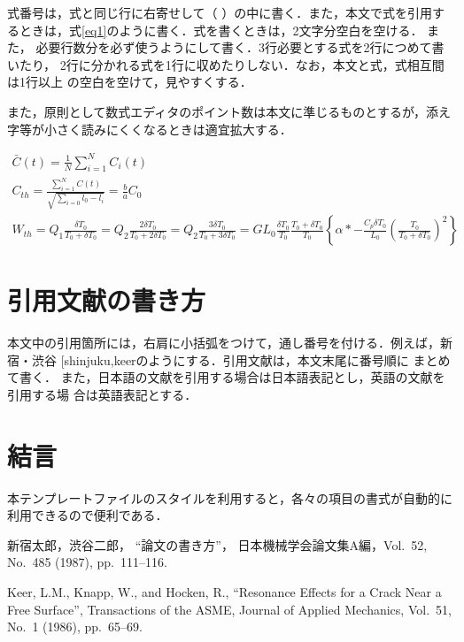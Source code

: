 \documentclass[a4paper, 10pt, dvips, fleqn]{jsarticle}
\makeatletter
\DeclareRobustCommand\cite{\unskip
\@ifnextchar[{\@tempswatrue\@citex}{\@tempswafalse\@citex[]}}
\makeatother
\begin{document}
式番号は，式と同じ行に右寄せして（ ）の中に書く．また，本文で式を引用す
るときは，式\eqref{eq1}のように書く．式を書くときは，2文字分空白を空ける．
また， 
必要行数分を必ず使うようにして書く．3行必要とする式を2行につめて書いたり，
2行に分かれる式を1行に収めたりしない．なお，本文と式，式相互間は1行以上
の空白を空けて，見やすくする． 

また，原則として数式エディタのポイント数は本文に準じるものとするが，添え
字等が小さく読みにくくなるときは適宜拡大する． 

\begin{gather}
 \bar{C}(t) = \frac{1}{N}\sum^{N}_{i=1}{C_{i}(t)} \\
 C_{th} = \frac{\displaystyle \sum^{N}_{i=1}{C(t)}}{\sqrt{\displaystyle \sum^{}_{i=0}{l_{0}-l_{i}}}}
 = \frac{b}{a}C_{0} \\
 W_{th} = Q_{1}\frac{\delta T_{0}}{T_{0} + \delta T_{0}}
 = Q_{2}\frac{2\delta T_{0}}{T_{0} + 2\delta T_{0}}
 = Q_{2}\frac{3\delta T_{0}}{T_{0} + 3\delta T_{0}}
 = GL_{0}\frac{\delta T_{0}}{T_{0}}\frac{T_{0} + \delta T_{0}}{T_{0}}
 \left\{ \alpha \ast -\frac{C_{p}\delta T_{0}}{L_{0}}
 \left( \frac{T_{0}}{T_{0} + \delta T_{0}} \right)^{2} \right\}
\end{gather}

\section{引用文献の書き方}

本文中の引用箇所には，右肩に小括弧をつけて，通し番号を付ける．例えば，新
宿・渋谷\cite{shinjuku,keer}のようにする．引用文献は，本文末尾に番号順に
まとめて書く． 
また，日本語の文献を引用する場合は日本語表記とし，英語の文献を引用する場
合は英語表記とする．

\section{結言}

本テンプレートファイルのスタイルを利用すると，各々の項目の書式が自動的に
利用できるので便利である． 

\begin{thebibliography}{10}
新宿太郎，渋谷二郎，
``論文の書き方''，
日本機械学会論文集A編，Vol.~52, No.~485 (1987), pp.~111--116.

Keer, L.M., Knapp, W., and Hocken, R., ``Resonance Effects for a
Crack Near a Free Surface'', Transactions of the ASME, Journal
of Applied Mechanics, Vol.~51, No.~1 (1986), pp.~65--69.
	

\end{thebibliography}
\end{document}
